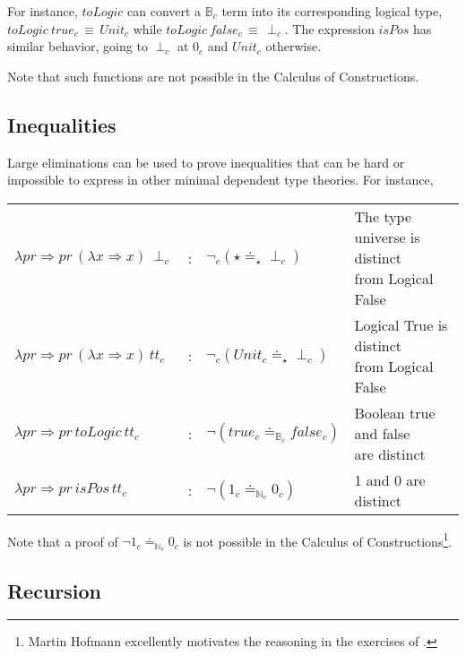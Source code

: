 For instance, $toLogic$ can convert a $\mathbb{B}_{c}$ term into its corresponding logical type, $toLogic\ true_{c}\,\equiv\, Unit_{c}$ while $toLogic\ false_{c}\, \equiv\, \perp_{c}$.
The expression $isPos$ has similar behavior, going to $\perp_{c}$ at $0_{c}$ and $Unit_{c}$ otherwise.

Note that such functions are not possible in the Calculus of Constructions.

\subsection{Inequalities}

Large eliminations can be used to prove inequalities that can be hard or impossible to express in other minimal dependent type theories. %
For instance, 

\begin{tabular}{lcll}
  $\lambda pr\Rightarrow pr\,\left(\lambda x\Rightarrow x\right)\,\perp_{c}$ & : & $\lnot_{c}(\star\doteq_{\star}\perp_{c})$ & \makecell{The type universe is distinct\\ from Logical False}\tabularnewline
  $\lambda pr\Rightarrow pr\,\left(\lambda x\Rightarrow x\right)\,tt_{c}$ & : & $\lnot_{c}(Unit_{c}\doteq_{\star}\perp_{c})$ &  \makecell{Logical True is distinct\\ from Logical False}\tabularnewline
  $\lambda pr\Rightarrow pr\,toLogic\,tt_{c}$ & : & $\lnot (true_{c}\doteq_{\mathbb{B}_{c}}false_{c})$ &  \makecell{Boolean true and false\\ are distinct}\tabularnewline
  $\lambda pr\Rightarrow pr\,isPos\,tt_{c}$ & : & $\lnot (1_{c}\doteq_{\mathbb{N}_{c}}0_{c})$ & 1 and 0 are distinct\tabularnewline
\end{tabular}
  


Note that a proof of $\lnot1_{c}\doteq_{\mathbb{N}_{c}}0_{c}$ is not possible in the Calculus of Constructions\cite{10.2307/2274575}\footnote{
  Martin Hofmann excellently motivates the reasoning in the exercises of \cite{hofmann_1997}.
}.

\subsection{Recursion}

